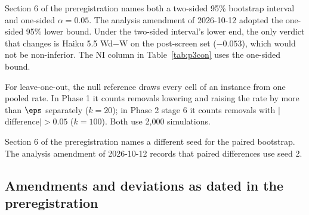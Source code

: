 Section 6 of the preregistration names both a two-sided 95\% bootstrap interval and one-sided $\alpha=0.05$. The analysis amendment of 2026-10-12 adopted the one-sided 95\% lower bound. Under the two-sided interval's lower end, the only verdict that changes is Haiku 5.5 Wd$-$W on the post-screen set ($-0.053$), which would not be non-inferior. The NI column in Table~\ref{tab:p3con} uses the one-sided bound.

For leave-one-out, the null reference draws every cell of an instance from one pooled rate. In Phase 1 it counts removals lowering and raising the rate by more than $\eps$ separately ($k=20$); in Phase 2 stage 6 it counts removals with $|$difference$| > 0.05$ ($k=100$). Both use 2,000 simulations.

Section 6 of the preregistration names a different seed for the paired bootstrap. The analysis amendment of 2026-10-12 records that paired differences use seed 2.

\subsection{Amendments and deviations as dated in the preregistration}

